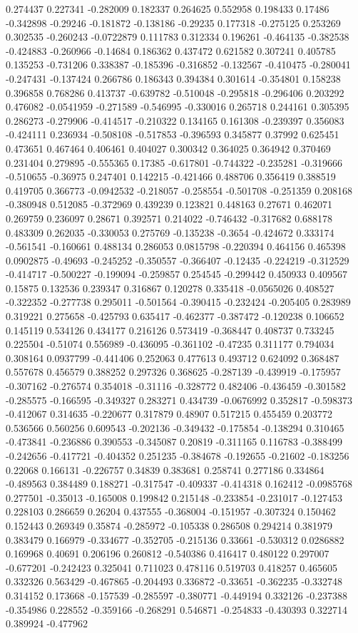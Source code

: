 0.274437 0.227341 -0.282009 0.182337 0.264625 0.552958 0.198433 0.17486 -0.342898 -0.29246 -0.181872 -0.138186 -0.29235 0.177318 -0.275125 0.253269 0.302535 -0.260243 -0.0722879 0.111783 0.312334 0.196261 -0.464135 -0.382538 -0.424883 -0.260966 -0.14684 0.186362 0.437472 0.621582 0.307241 0.405785 0.135253 -0.731206 0.338387 -0.185396 -0.316852 -0.132567 -0.410475 -0.280041 -0.247431 -0.137424 0.266786 0.186343 0.394384 0.301614 -0.354801 0.158238 0.396858 0.768286 0.413737 -0.639782 -0.510048 -0.295818 -0.296406 0.203292 0.476082 -0.0541959 -0.271589 -0.546995 -0.330016 0.265718 0.244161 0.305395 0.286273 -0.279906 -0.414517 -0.210322 0.134165 0.161308 -0.239397 0.356083 -0.424111 0.236934 -0.508108 -0.517853 -0.396593 0.345877 0.37992 0.625451 0.473651 0.467464 0.406461 0.404027 0.300342 0.364025 0.364942 0.370469 0.231404 0.279895 -0.555365 0.17385 -0.617801 -0.744322 -0.235281 -0.319666 -0.510655 -0.36975 0.247401 0.142215 -0.421466 0.488706 0.356419 0.388519 0.419705 0.366773 -0.0942532 -0.218057 -0.258554 -0.501708 -0.251359 0.208168 -0.380948 0.512085 -0.372969 0.439239 0.123821 0.448163 0.27671 0.462071 0.269759 0.236097 0.28671 0.392571 0.214022 -0.746432 -0.317682 0.688178 0.483309 0.262035 -0.330053 0.275769 -0.135238 -0.3654 -0.424672 0.333174 -0.561541 -0.160661 0.488134 0.286053 0.0815798 -0.220394 0.464156 0.465398 0.0902875 -0.49693 -0.245252 -0.350557 -0.366407 -0.12435 -0.224219 -0.312529 -0.414717 -0.500227 -0.199094 -0.259857 0.254545 -0.299442 0.450933 0.409567 0.15875 0.132536 0.239347 0.316867 0.120278 0.335418 -0.0565026 0.408527 -0.322352 -0.277738 0.295011 -0.501564 -0.390415 -0.232424 -0.205405 0.283989 0.319221 0.275658 -0.425793 0.635417 -0.462377 -0.387472 -0.120238 0.106652 0.145119 0.534126 0.434177 0.216126 0.573419 -0.368447 0.408737 0.733245 0.225504 -0.51074 0.556989 -0.436095 -0.361102 -0.47235 0.311177 0.794034 0.308164 0.0937799 -0.441406 0.252063 0.477613 0.493712 0.624092 0.368487 0.557678 0.456579 0.388252 0.297326 0.368625 -0.287139 -0.439919 -0.175957 -0.307162 -0.276574 0.354018 -0.31116 -0.328772 0.482406 -0.436459 -0.301582 -0.285575 -0.166595 -0.349327 0.283271 0.434739 -0.0676992 0.352817 -0.598373 -0.412067 0.314635 -0.220677 0.317879 0.48907 0.517215 0.455459 0.203772 0.536566 0.560256 0.609543 -0.202136 -0.349432 -0.175854 -0.138294 0.310465 -0.473841 -0.236886 0.390553 -0.345087 0.20819 -0.311165 0.116783 -0.388499 -0.242656 -0.417721 -0.404352 0.251235 -0.384678 -0.192655 -0.21602 -0.183256 0.22068 0.166131 -0.226757 0.34839 0.383681 0.258741 0.277186 0.334864 -0.489563 0.384489 0.188271 -0.317547 -0.409337 -0.414318 0.162412 -0.0985768 0.277501 -0.35013 -0.165008 0.199842 0.215148 -0.233854 -0.231017 -0.127453 0.228103 0.286659 0.26204 0.437555 -0.368004 -0.151957 -0.307324 0.150462 0.152443 0.269349 0.35874 -0.285972 -0.105338 0.286508 0.294214 0.381979 0.383479 0.166979 -0.334677 -0.352705 -0.215136 0.33661 -0.530312 0.0286882 0.169968 0.40691 0.206196 0.260812 -0.540386 0.416417 0.480122 0.297007 -0.677201 -0.242423 0.325041 0.711023 0.478116 0.519703 0.418257 0.465605 0.332326 0.563429 -0.467865 -0.204493 0.336872 -0.33651 -0.362235 -0.332748 0.314152 0.173668 -0.157539 -0.285597 -0.380771 -0.449194 0.332126 -0.237388 -0.354986 0.228552 -0.359166 -0.268291 0.546871 -0.254833 -0.430393 0.322714 0.389924 -0.477962 